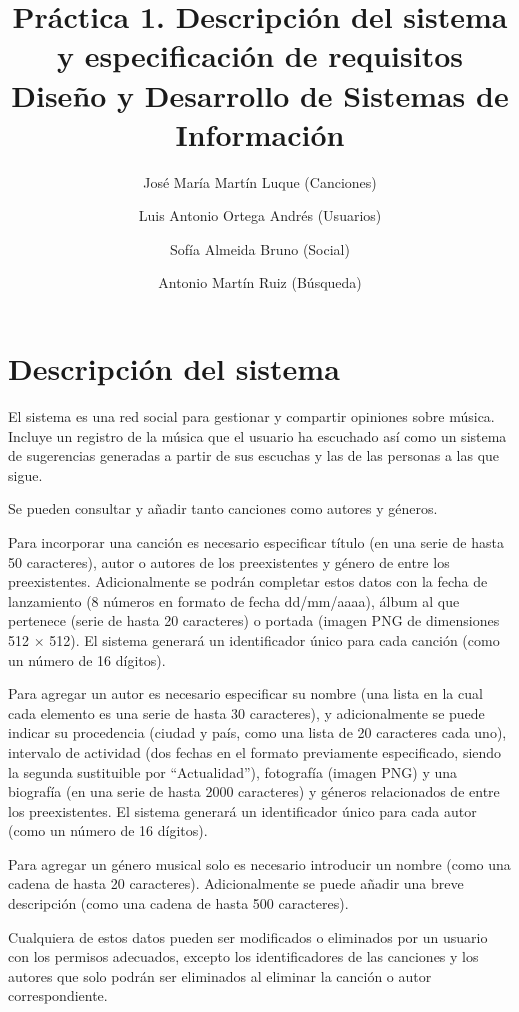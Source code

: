 \documentclass[
  12pt,
  a4paper,
  DIV=12,
  spanish,
]{scrartcl}
\title{Práctica 1. Descripción del sistema y especificación de requisitos \\\large Diseño y Desarrollo de Sistemas de Información}
\author{José María Martín Luque (Canciones) \and Luis Antonio Ortega Andrés (Usuarios) \and Sofía Almeida Bruno (Social) \and Antonio Martín Ruiz (Búsqueda)  }
\begin{document}
\maketitle

\section{Descripción del sistema} %

El sistema es una red social para gestionar y compartir opiniones sobre música. Incluye un registro de la música que el usuario ha escuchado así como un sistema de sugerencias generadas a partir de sus escuchas y las de las personas a las que sigue.

Se pueden consultar y añadir tanto canciones como autores y géneros.

Para incorporar una canción es necesario especificar título (en una serie de hasta 50 caracteres), autor o autores de los preexistentes y género de entre los preexistentes. Adicionalmente se podrán completar estos datos con la fecha de lanzamiento (8 números en formato de fecha dd/mm/aaaa), álbum al que pertenece (serie de hasta 20 caracteres) o portada (imagen PNG de dimensiones 512 $\times$ 512). El sistema generará un identificador único para cada canción (como un número de 16 dígitos).

Para agregar un autor es necesario especificar su nombre (una lista en la cual cada elemento es una serie de hasta 30 caracteres), y adicionalmente se puede indicar su procedencia (ciudad y país, como una lista de 20 caracteres cada uno), intervalo de actividad (dos fechas en el formato previamente especificado, siendo la segunda sustituible por ``Actualidad''), fotografía (imagen PNG) y una biografía (en una serie de hasta 2000 caracteres) y géneros relacionados de entre los preexistentes. El sistema generará un identificador único para cada autor (como un número de 16 dígitos).

Para agregar un género musical solo es necesario introducir un nombre (como una cadena de hasta 20 caracteres). Adicionalmente se puede añadir una breve descripción (como una cadena de hasta 500 caracteres).

Cualquiera de estos datos pueden ser modificados o eliminados por un usuario con los permisos adecuados, excepto los identificadores de las canciones y los autores que solo podrán ser eliminados al eliminar la canción o autor correspondiente.

\end{document}
